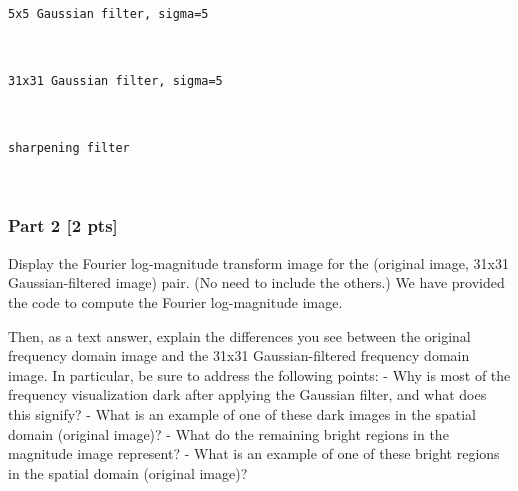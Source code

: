 \documentclass[11pt]{article}
\begin{document}
    \begin{Verbatim}[commandchars=\\\{\}]
5x5 Gaussian filter, sigma=5
\end{Verbatim}

    \begin{center}
    \end{center}
    { \hspace*{\fill} \\}
    
    \begin{Verbatim}[commandchars=\\\{\}]
31x31 Gaussian filter, sigma=5
\end{Verbatim}

    \begin{center}
    \end{center}
    { \hspace*{\fill} \\}
    
    \begin{Verbatim}[commandchars=\\\{\}]
sharpening filter
\end{Verbatim}

    \begin{center}
    \end{center}
    { \hspace*{\fill} \\}
    
    \hypertarget{part-2-2-pts}{%
\subsubsection{Part 2 {[}2 pts{]}}\label{part-2-2-pts}}

Display the Fourier log-magnitude transform image for the (original
image, 31x31 Gaussian-filtered image) pair. (No need to include the
others.) We have provided the code to compute the Fourier log-magnitude
image.

Then, as a text answer, explain the differences you see between the
original frequency domain image and the 31x31 Gaussian-filtered
frequency domain image. In particular, be sure to address the following
points: - Why is most of the frequency visualization dark after applying
the Gaussian filter, and what does this signify? - What is an example of
one of these dark images in the spatial domain (original image)? - What
do the remaining bright regions in the magnitude image represent? - What
is an example of one of these bright regions in the spatial domain
(original image)?
\end{document}
